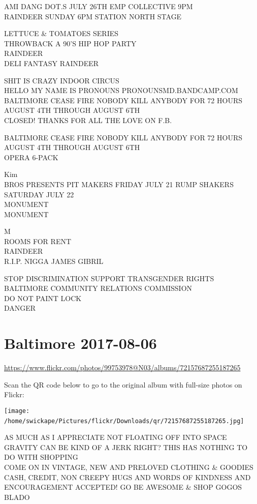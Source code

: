 \documentclass[10pt,letterpaper]{article}
\begin{document}
AMI DANG DOT.S JULY 26TH EMP COLLECTIVE 9PM\\
RAINDEER SUNDAY 6PM STATION NORTH STAGE

LETTUCE \& TOMATOES SERIES\\
THROWBACK A 90'S HIP HOP PARTY\\
RAINDEER\\
DELI FANTASY RAINDEER

SHIT IS CRAZY INDOOR CIRCUS\\
HELLO MY NAME IS PRONOUNS PRONOUNSMD.BANDCAMP.COM\\
BALTIMORE CEASE FIRE NOBODY KILL ANYBODY FOR 72 HOURS AUGUST 4TH THROUGH AUGUST 6TH\\
CLOSED! THANKS FOR ALL THE LOVE ON F.B.

BALTIMORE CEASE FIRE NOBODY KILL ANYBODY FOR 72 HOURS AUGUST 4TH THROUGH AUGUST 6TH\\
OPERA 6{-}PACK

Kim\\
BROS PRESENTS PIT MAKERS FRIDAY JULY 21 RUMP SHAKERS SATURDAY JULY 22\\
MONUMENT\\
MONUMENT

M\\
ROOMS FOR RENT\\
RAINDEER\\
R.I.P. NIGGA JAMES GIBRIL

STOP DISCRIMINATION SUPPORT TRANSGENDER RIGHTS BALTIMORE COMMUNITY RELATIONS COMMISSION\\
DO NOT PAINT LOCK\\
DANGER
\

\section*{Baltimore 2017-08-06}

\url{https://www.flickr.com/photos/99753978@N03/albums/72157687255187265}

Scan the QR code below to go to the original album with full-size photos on Flickr:

\texttt{[image: /home/swickape/Pictures/flickr/Downloads/qr/72157687255187265.jpg]}
\

AS MUCH AS I APPRECIATE NOT FLOATING OFF INTO SPACE GRAVITY CAN BE KIND OF A JERK RIGHT?  THIS HAS NOTHING TO DO WITH SHOPPING\\
COME ON IN VINTAGE, NEW AND PRELOVED CLOTHING \& GOODIES CASH, CREDIT, NON CREEPY HUGS AND WORDS OF KINDNESS AND ENCOURAGEMENT ACCEPTED!  GO BE AWESOME \& SHOP GOGOS\\
BLADO
\end{document}
